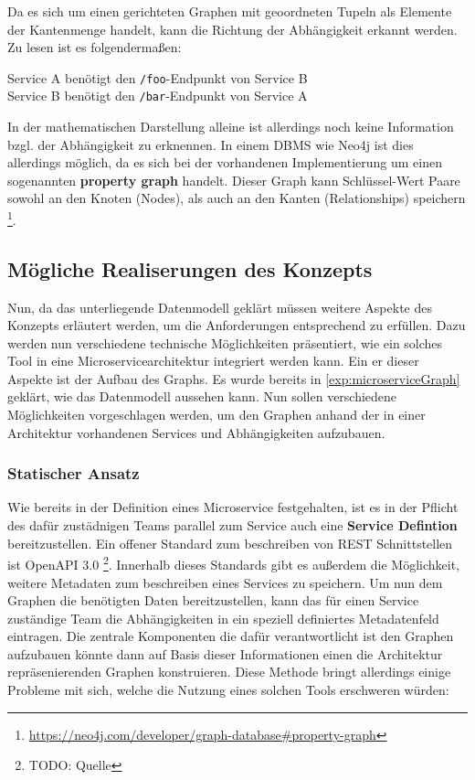 \documentclass[
	12pt,
	BCOR=5mm,
	DIV=12,
	headinclude=on,
	footinclude=off,
	parskip=half,
	bibliography=totoc,
	listof=entryprefix,
	toc=listof,
	numbers=noenddot,
	plainfootsepline
]{scrreprt}
\begin{document}
Da es sich um einen gerichteten Graphen mit geoordneten Tupeln als Elemente der Kantenmenge handelt, kann die Richtung der Abhängigkeit erkannt werden. Zu lesen ist es folgendermaßen:

\begin{center}
	Service A benötigt den \texttt{/foo}-Endpunkt von Service B\\
	Service B benötigt den \texttt{/bar}-Endpunkt von Service A
\end{center}

In der mathematischen Darstellung alleine ist allerdings noch keine Information bzgl. der Abhängigkeit zu erknennen. In einem \ac{DBMS} wie Neo4j ist dies allerdings möglich, da es sich bei der vorhandenen Implementierung um einen sogenannten \textbf{property graph} handelt. Dieser Graph kann Schlüssel-Wert Paare sowohl an den Knoten (Nodes), als auch an den Kanten (Relationships) speichern \footnote{\url{https://neo4j.com/developer/graph-database\#property-graph}}.

\subsection{Mögliche Realiserungen des Konzepts}

Nun, da das unterliegende Datenmodell geklärt müssen weitere Aspekte des Konzepts erläutert werden, um die Anforderungen entsprechend zu erfüllen. Dazu werden nun verschiedene technische Möglichkeiten präsentiert, wie ein solches Tool in eine Microservicearchitektur integriert werden kann. Ein er dieser Aspekte ist der Aufbau des Graphs. Es wurde bereits in \vref{exp:microserviceGraph} geklärt, wie das Datenmodell aussehen kann. Nun sollen verschiedene Möglichkeiten vorgeschlagen werden, um den Graphen anhand der in einer Architektur vorhandenen Services und Abhängigkeiten aufzubauen.

\subsubsection*{Statischer Ansatz}
Wie bereits in der Definition eines Microservice festgehalten, ist es in der Pflicht des dafür zustädnigen Teams parallel zum Service auch eine \textbf{Service Defintion} bereitzustellen. Ein offener Standard zum beschreiben von REST Schnittstellen ist OpenAPI 3.0 \footnote{TODO: Quelle}. Innerhalb dieses Standards gibt es außerdem die Möglichkeit, weitere Metadaten zum beschreiben eines Services zu speichern. Um nun dem Graphen die benötigten Daten bereitzustellen, kann das für einen Service zuständige Team die Abhängigkeiten in ein speziell definiertes Metadatenfeld eintragen. Die zentrale Komponenten die dafür verantwortlicht ist den Graphen aufzubauen könnte dann auf Basis dieser Informationen einen die Architektur repräsenierenden Graphen konstruieren. Diese Methode bringt allerdings einige Probleme mit sich, welche die Nutzung eines solchen Tools erschweren würden:
\end{document}
